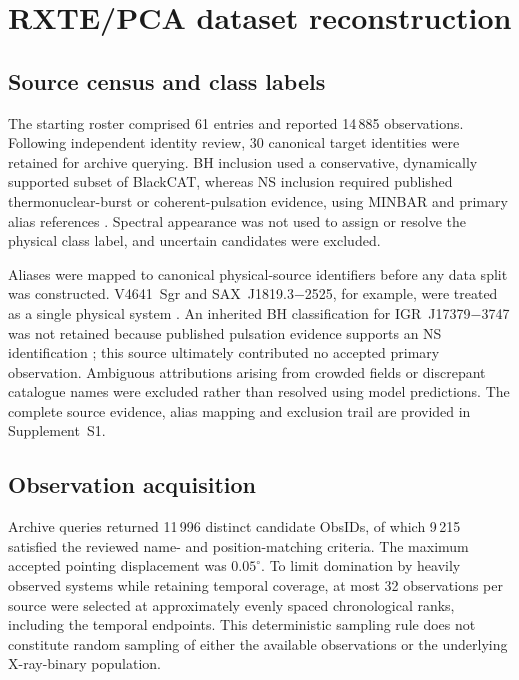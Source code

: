 \documentclass[final,5p,authoryear,nopreprintline]{elsarticle}
\begin{document}
\section{RXTE/PCA dataset reconstruction}
\label{sec:dataset}

\subsection{Source census and class labels}

The starting roster comprised 61 entries and reported 14\,885 observations. Following independent identity review, 30 canonical target identities were retained for archive querying. BH inclusion used a conservative, dynamically supported subset of BlackCAT, whereas NS inclusion required published thermonuclear-burst or coherent-pulsation evidence, using MINBAR and primary alias references \citep{CorralSantana2016,Galloway2020}. Spectral appearance was not used to assign or resolve the physical class label, and uncertain candidates were excluded.

Aliases were mapped to canonical physical-source identifiers before any data split was constructed. V4641~Sgr and SAX~J1819.3$-$2525, for example, were treated as a single physical system \citep{Orosz2001}. An inherited BH classification for IGR~J17379$-$3747 was not retained because published pulsation evidence supports an NS identification \citep{Sanna2018}; this source ultimately contributed no accepted primary observation. Ambiguous attributions arising from crowded fields or discrepant catalogue names were excluded rather than resolved using model predictions. The complete source evidence, alias mapping and exclusion trail are provided in Supplement~S1.

\subsection{Observation acquisition}

Archive queries returned 11\,996 distinct candidate ObsIDs, of which 9\,215 satisfied the reviewed name- and position-matching criteria. The maximum accepted pointing displacement was $0.05^\circ$. To limit domination by heavily observed systems while retaining temporal coverage, at most 32 observations per source were selected at approximately evenly spaced chronological ranks, including the temporal endpoints. This deterministic sampling rule does not constitute random sampling of either the available observations or the underlying X-ray-binary population.
\end{document}
